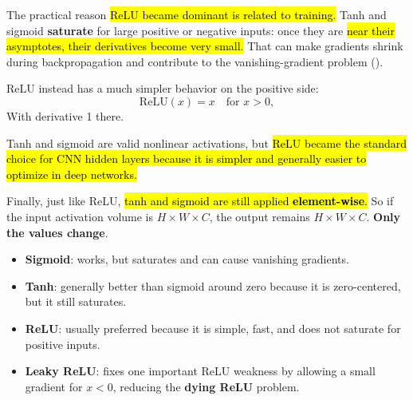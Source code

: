 \noindent
The practical reason \hl{ReLU became dominant is related to training.} Tanh and sigmoid \textbf{saturate} for large positive or negative inputs: once they are \hl{near their asymptotes, their derivatives become very small.} That can make gradients shrink during backpropagation and contribute to the vanishing-gradient problem ().

\highspace
ReLU instead has a much simpler behavior on the positive side:
\begin{equation*}
    \mathrm{ReLU}(x) = x \quad \text{for } x > 0,
\end{equation*}
With derivative 1 there.

\highspace
Tanh and sigmoid are valid nonlinear activations, but \hl{ReLU became the standard choice for CNN hidden layers because it is simpler and generally easier to optimize in deep networks.}

\highspace
Finally, just like ReLU, \hl{tanh and sigmoid are still applied \textbf{element-wise}.} So if the input activation volume is $H \times W \times C$, the output remains $H \times W \times C$. \textbf{Only the values change}.
\begin{itemize}
    \item \textbf{Sigmoid}: works, but saturates and can cause vanishing gradients.
    \item \textbf{Tanh}: generally better than sigmoid around zero because it is zero-centered, but it still saturates.
    \item \textbf{ReLU}: usually preferred because it is simple, fast, and does not saturate for positive inputs.
    \item \textbf{Leaky ReLU}: fixes one important ReLU weakness by allowing a small gradient for $x < 0$, reducing the \textbf{dying ReLU} problem.
\end{itemize}
